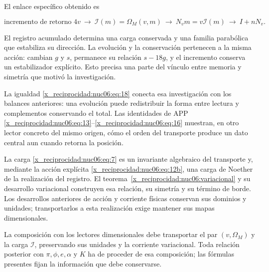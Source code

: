 El enlace específico obtenido es

\begin{equation}
\text{incremento de retorno }4v
\ \longrightarrow\ \mathcal I(m)=\Omega_M(v,m)
\ \longrightarrow\ N_vm=v\mathcal I(m)
\ \longrightarrow\ I+nN_v.
\label{x_reciprocidad:nuc06:eq:21}
\end{equation}

El registro acumulado determina una carga conservada y una familia parabólica que estabiliza su dirección. La evolución y la conservación pertenecen a la misma acción: cambian \(g\) y \(s\), permanece su relación \(s-18g\), y el incremento conserva un estabilizador explícito. Esto precisa una parte del vínculo entre memoria y simetría que motivó la investigación.

La igualdad \eqref{x_reciprocidad:nuc06:eq:18} conecta esa investigación con los balances anteriores: una evolución puede redistribuir la forma entre lectura y complementos conservando el total. Las identidades de APP \eqref{x_reciprocidad:nuc06:eq:13}–\eqref{x_reciprocidad:nuc06:eq:16} muestran, en otro lector concreto del mismo origen, cómo el orden del transporte produce un dato central aun cuando retorna la posición.

La carga \eqref{x_reciprocidad:nuc06:eq:7} es un invariante algebraico del transporte y, mediante la acción explícita \eqref{x_reciprocidad:nuc06:eq:12b}, una carga de Noether de la realización del registro. El teorema~\ref{x_reciprocidad:nuc06:variacional} y su desarrollo variacional construyen esa relación, su simetría y su término de borde. Los desarrollos anteriores de acción y corriente físicas conservan sus dominios y unidades; transportarlos a esta realización exige mantener sus mapas dimensionales.

La composición con los lectores dimensionales debe transportar el par \((v,\Omega_M)\) y la carga \(\mathcal I\), preservando sus unidades y la corriente variacional. Toda relación posterior con \(\pi,\phi,e,\alpha\) y \(K\) ha de proceder de esa composición; las fórmulas presentes fijan la información que debe conservarse.
